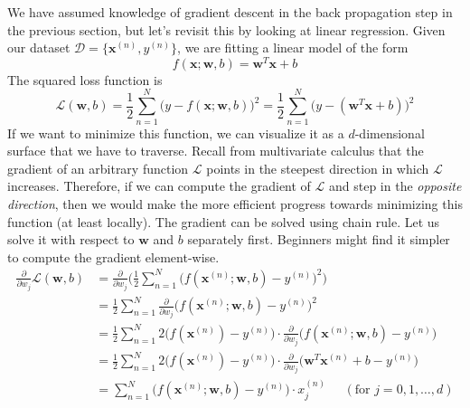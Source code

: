   \begin{example}
    We have assumed knowledge of gradient descent in the back propagation step in the previous section, but let's revisit this by looking at linear regression. Given our dataset $\mathcal{D} = \{\mathbf{x}^(n), y^{(n)}\}$, we are fitting a linear model of the form 
    \begin{equation}
      f(\mathbf{x}; \mathbf{w}, b) = \mathbf{w}^T \mathbf{x} + b
    \end{equation} 
    The squared loss function is 
    \begin{equation}
      \mathcal{L}(\mathbf{w}, b) = \frac{1}{2} \sum_{n=1}^N \big( y - f(\mathbf{x}; \mathbf{w}, b) \big)^2 = \frac{1}{2} \sum_{n=1}^N \big( y - (\mathbf{w}^T \mathbf{x} + b) \big)^2  
    \end{equation}
    If we want to minimize this function, we can visualize it as a $d$-dimensional surface that we have to traverse. Recall from multivariate calculus that the gradient of an arbitrary function $\mathcal{L}$ points in the steepest direction in which $\mathcal{L}$ increases. Therefore, if we can compute the gradient of $\mathcal{L}$ and step in the \textit{opposite direction}, then we would make the more efficient progress towards minimizing this function (at least locally). The gradient can be solved using chain rule. Let us solve it with respect to $\mathbf{w}$ and $b$ separately first. Beginners might find it simpler to compute the gradient element-wise. 
    \begin{align}
      \frac{\partial}{\partial w_j} \mathcal{L}(\mathbf{w}, b) 
      & = \frac{\partial}{\partial w_j} \bigg(\frac{1}{2} \sum_{n=1}^N \Big( f (\mathbf{x}^{(n)}; \mathbf{w}, b) - y^{(n)} \Big)^2 \bigg) \\
      & = \frac{1}{2} \sum_{n=1}^N \frac{\partial}{\partial w_j} \Big( f(\mathbf{x}^{(n)}; \mathbf{w}, b) - y^{(n)}\Big)^2 \\
      & = \frac{1}{2} \sum_{n=1}^N 2 \Big( f(\mathbf{x}^{(n)}) - y^{(n)}\Big) \cdot \frac{\partial}{\partial w_j} \big( f(\mathbf{x}^{(n)}; \mathbf{w}, b) - y^{(n)} \big) \\
      & = \frac{1}{2} \sum_{n=1}^N 2 \Big( f(\mathbf{x}^{(n)}) - y^{(n)}\Big) \cdot \frac{\partial}{\partial w_j} \big( \mathbf{w}^T \mathbf{x}^{(n)} + b - y^{(n)} \big) \\
      & = \sum_{n=1}^N \big( f(\mathbf{x}^{(n)}; \mathbf{w}, b) - y^{(n)}\big) \cdot x_j^{(n)} \;\;\;\;\;(\text{for } j = 0, 1, \ldots, d)
    \end{align}

\end{example}
